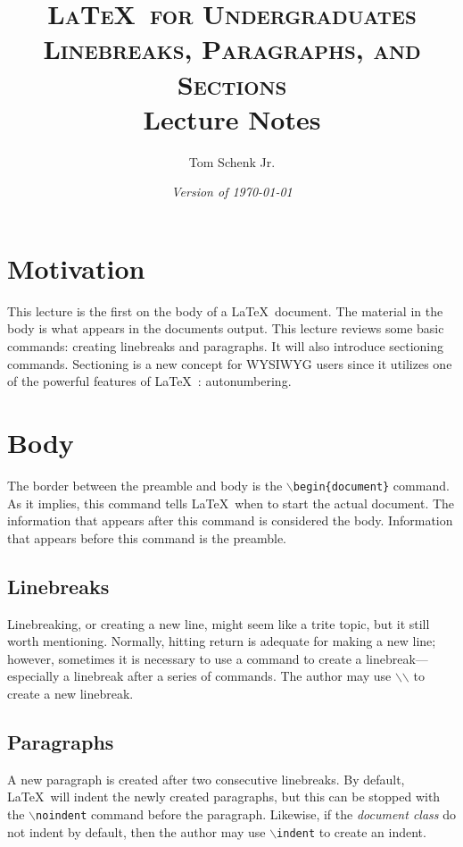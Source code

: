 \documentclass{article}
\title{\textsc{\LaTeX\ for Undergraduates\\
			Linebreaks, Paragraphs, and Sections} \\
			Lecture Notes}
\author{Tom Schenk Jr.}		%
\date{\textit{Version of \today}}
\begin{document}
\maketitle

\section{Motivation}

This lecture is the first on the body of a \LaTeX\ document. The material in the body is what appears in the documents output. This lecture reviews some basic commands: creating linebreaks and paragraphs. It will also introduce sectioning commands. Sectioning is a new concept for WYSIWYG users since it utilizes one of the powerful features of \LaTeX\ : autonumbering.

\section{Body}

The border between the preamble and body is the \texttt{$\backslash$begin\{document\}} command. As it implies, this command tells \LaTeX\ when to start the actual document. The information that appears after this command is considered the body. Information that appears before this command is the preamble.

\subsection{Linebreaks}

Linebreaking, or creating a new line, might seem like a trite topic, but it still worth mentioning. Normally, hitting return is adequate for making a new line; however, sometimes it is necessary to use a command to create a linebreak---especially a linebreak after a series of commands. The author may use \texttt{$\backslash$$\backslash$} to create a new linebreak.

\subsection{Paragraphs}

A new paragraph is created after two consecutive linebreaks. By default, \LaTeX\ will indent the newly created paragraphs, but this can be stopped with the \texttt{$\backslash$noindent} command before the paragraph. Likewise, if the \textit{document class} do not indent by default, then the author may use \texttt{$\backslash$indent} to create an indent.
\end{document}
